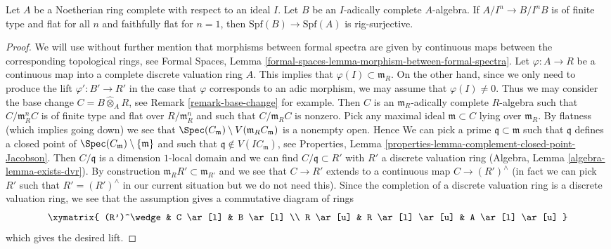 \begin{lemma}
\label{lemma-faithfully-flat-rig-surjective}
Let $A$ be a Noetherian ring complete with respect to an ideal $I$.
Let $B$ be an $I$-adically complete $A$-algebra.
If $A/I^n \to B/I^nB$ is of finite type and flat for all $n$ and
faithfully flat for $n = 1$, then $\text{Spf}(B) \to \text{Spf}(A)$
is rig-surjective.
\end{lemma}

\begin{proof}
We will use without further mention that morphisms between formal spectra
are given by continuous maps between the corresponding topological rings, see
Formal Spaces, Lemma \ref{formal-spaces-lemma-morphism-between-formal-spectra}.
Let $\varphi : A \to R$ be a continuous map into a complete discrete
valuation ring $A$. This implies that $\varphi(I) \subset \mathfrak m_R$.
On the other hand, since we only need to produce the lift
$\varphi' : B' \to R'$ in the case that $\varphi$ corresponds to an adic
morphism, we may assume that $\varphi(I) \not = 0$. Thus we may consider
the base change $C = B \widehat{\otimes}_A R$, see
Remark \ref{remark-base-change} for example.
Then $C$ is an $\mathfrak m_R$-adically complete $R$-algebra
such that $C/\mathfrak m_R^n C$ is of finite type and flat over
$R/\mathfrak m_R^n$ and such that $C/\mathfrak m_R C$ is nonzero.
Pick any maximal ideal $\mathfrak m \subset C$ lying over
$\mathfrak m_R$. By flatness (which implies going down) we see that
$\Spec(C_\mathfrak m) \setminus V(\mathfrak m_R C_\mathfrak m)$
is a nonempty open. Hence
We can pick a prime $\mathfrak q \subset \mathfrak m$
such that $\mathfrak q$ defines a closed point of
$\Spec(C_\mathfrak m) \setminus \{\mathfrak m\}$ and such that
$\mathfrak q \not \in V(IC_\mathfrak m)$, see
Properties, Lemma \ref{properties-lemma-complement-closed-point-Jacobson}.
Then $C/\mathfrak q$ is a dimension $1$-local domain and we can find
$C/\mathfrak q \subset R'$ with $R'$ a discrete valuation ring
(Algebra, Lemma \ref{algebra-lemma-exists-dvr}).
By construction $\mathfrak m_R R' \subset \mathfrak m_{R'}$
and we see that $C \to R'$ extends to a continuous map
$C \to (R')^\wedge$ (in fact we can pick $R'$ such that
$R' = (R')^\wedge$ in our current situation but we do not need this).
Since the completion of a discrete valuation ring is a discrete
valuation ring, we see that the assumption gives a commutative
diagram of rings
$$
\xymatrix{
(R')^\wedge & C \ar[l] & B \ar[l] \\
R \ar[u] & R \ar[l] \ar[u] & A \ar[l] \ar[u]
}
$$
which gives the desired lift.
\end{proof}

